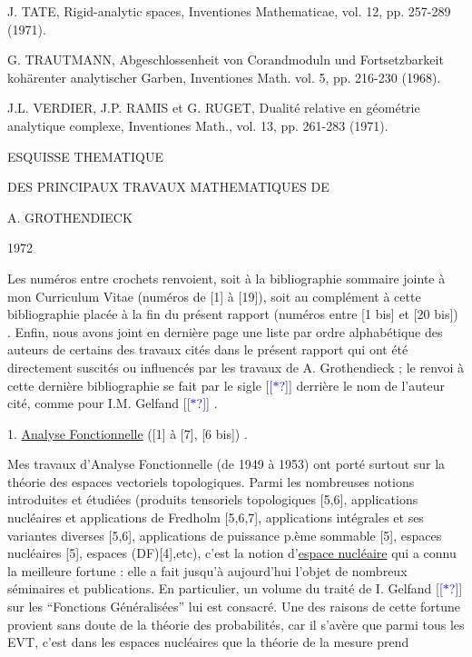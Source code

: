 \documentclass[11pt]{article}
\newcommand{\scanpage}[1]{\par\bigskip\noindent{\small\sffamily[scan #1]}\par}
\newcommand{\mspage}[1]{{\small\sffamily[p.\,#1]}}
\newcommand{\hand}[1]{\textcolor{blue}{#1}}
\newcommand{\uline}[1]{\underline{#1}}
\newcommand{\unsure}[1]{[#1?]}
\begin{document}
J. TATE, Rigid-analytic spaces, Inventiones Mathematicae, vol. 12, pp. 257-289
(1971).

G. TRAUTMANN, Abgeschlossenheit von Corandmoduln und Fortsetzbarkeit kohärenter
analytischer Garben, Inventiones Math. vol. 5, pp. 216-230 (1968).

J.L. VERDIER, J.P. RAMIS et G. RUGET, Dualité relative en géométrie analytique
complexe, Inventiones Math., vol. 13, pp. 261-283 (1971).

\mspage{\hand{212}}

\clearpage
\scanpage{119/214}
ESQUISSE THEMATIQUE

DES PRINCIPAUX TRAVAUX MATHEMATIQUES DE

A. GROTHENDIECK

1972

Les numéros entre crochets renvoient, soit à
la bibliographie sommaire jointe à mon Curriculum Vitae
(numéros de [1] à [19]), soit au complément à cette
bibliographie placée à la fin du présent rapport (numéros
entre [1 bis] et [20 bis]) . Enfin, nous avons joint
en dernière page une liste par ordre alphabétique des
auteurs de certains des travaux cités dans le présent
rapport qui ont été directement suscités ou influencés
par les travaux de A. Grothendieck ; le renvoi à cette
dernière bibliographie se fait par le sigle [\hand{\unsure{$\ast$}}] derrière
le nom de l'auteur cité, comme pour I.M. Gelfand [\hand{\unsure{$\ast$}}] .

1. \uline{Analyse Fonctionnelle} ([1] à [7], [6 bis]) .

Mes travaux d'Analyse Fonctionnelle (de 1949
à 1953) ont porté surtout sur la théorie des espaces
vectoriels topologiques. Parmi les nombreuses notions
introduites et étudiées (produits tensoriels topologiques
[5,6], applications nucléaires et applications de
Fredholm [5,6,7], applications intégrales et ses
variantes diverses [5,6], applications de puissance p.ème
sommable [5], espaces nucléaires [5], espaces (DF)[4],etc),
c'est la notion d'\uline{espace nucléaire} qui a connu la meilleure
fortune : elle a fait jusqu'à aujourd'hui l'objet de
nombreux séminaires et publications. En particulier,
un volume du traité de I. Gelfand [\hand{\unsure{$\ast$}}] sur les ``Fonctions
Généralisées'' lui est consacré. Une des raisons de cette
fortune provient sans doute de la théorie des probabilités,
car il s'avère que parmi tous les EVT, c'est dans les
espaces nucléaires que la théorie de la mesure prend
\end{document}
